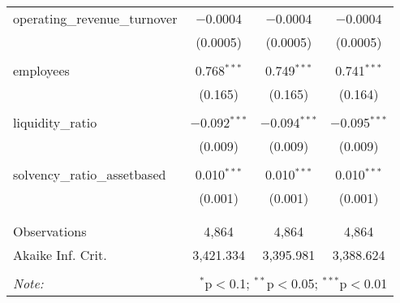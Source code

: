 \begin{table}[!htbp]
\begin{tabular}{@{\extracolsep{5pt}}lccc}
 operating\_revenue\_turnover & $-$0.0004 & $-$0.0004 & $-$0.0004 \\ 
  & (0.0005) & (0.0005) & (0.0005) \\ 
  & & & \\ 
 employees & 0.768$^{***}$ & 0.749$^{***}$ & 0.741$^{***}$ \\ 
  & (0.165) & (0.165) & (0.164) \\ 
  & & & \\ 
 liquidity\_ratio & $-$0.092$^{***}$ & $-$0.094$^{***}$ & $-$0.095$^{***}$ \\ 
  & (0.009) & (0.009) & (0.009) \\ 
  & & & \\ 
 solvency\_ratio\_assetbased & 0.010$^{***}$ & 0.010$^{***}$ & 0.010$^{***}$ \\ 
  & (0.001) & (0.001) & (0.001) \\ 
  & & & \\ 
\hline \\[-1.8ex] 
Observations & 4,864 & 4,864 & 4,864 \\ 
Akaike Inf. Crit. & 3,421.334 & 3,395.981 & 3,388.624 \\ 
\hline 
\hline \\[-1.8ex] 
\textit{Note:}  & \multicolumn{3}{r}{$^{*}$p$<$0.1; $^{**}$p$<$0.05; $^{***}$p$<$0.01} \\ 
\end{tabular} 
\end{table} 
